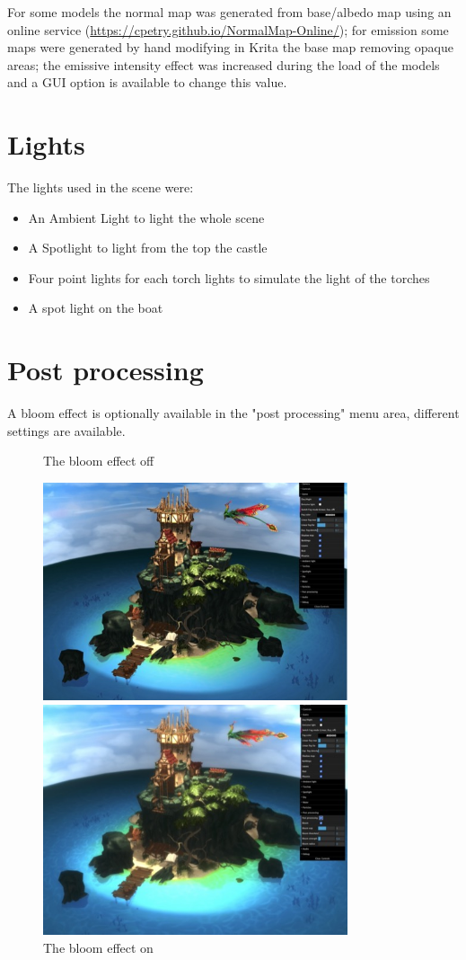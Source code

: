 \documentclass[10pt,a4paper]{article}
\begin{document}
For some models the normal map was generated from base/albedo map using an online service (\url{https://cpetry.github.io/NormalMap-Online/}); for emission some maps were generated by hand modifying in Krita the base map removing opaque areas; the emissive intensity effect was increased during the load of the models and a GUI option is available to change this value.

\section{Lights}
The lights used in the scene were:

\begin{itemize}
\item An Ambient Light to light the whole scene
\item A Spotlight to light from the top the castle
\item Four point lights for each torch lights to simulate the light of the torches
\item A spot light on the boat
\end{itemize}


\section{Post processing}

A bloom effect is optionally available in the "post processing" menu area, different settings are available.

\begin{figure}[H]
\centering
\caption{The bloom effect off}
\includegraphics[width=0.8\textwidth]{bloom_off}
\caption{The bloom effect on}
\includegraphics[width=0.8\textwidth]{bloom_on}
\end{figure}
\end{document}
